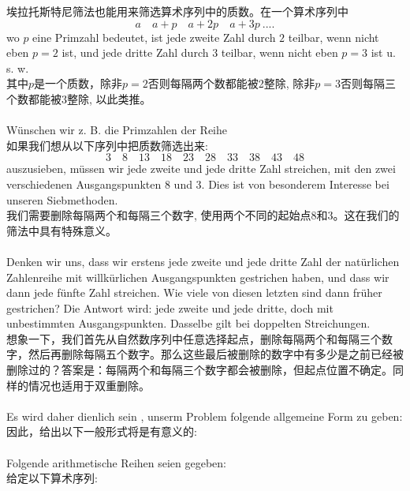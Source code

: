 \documentclass[UTF8,a4paper,zihao=-4]{article}
\begin{document}
\indent 埃拉托斯特尼筛法也能用来筛选算术序列中的质数。在一个算术序列中
$$
a\quad a + p\quad a + 2p\quad a + 3p\ ....
$$
wo $p$ eine Primzahl bedeutet, ist jede zweite Zahl durch $2$ teilbar, wenn nicht eben $p = 2$ ist, und jede dritte Zahl durch $3$ teilbar, wenn nicht eben $p = 3$ ist u. s. w.\\
其中$p$是一个质数，除非$p = 2$否则每隔两个数都能被2整除, 除非$p=3$否则每隔三个数都能被$3$整除, 以此类推。\\\\
\indent Wünschen wir z. B. die Primzahlen der Reihe\\
\indent 如果我们想从以下序列中把质数筛选出来:
$$3\quad 8\quad 13\quad 18\quad 23\quad 28\quad 33\quad 38\quad 43\quad 48$$
auszusieben, müssen wir jede zweite und jede dritte Zahl streichen, mit den zwei verschiedenen Ausgangspunkten 8 und 3. Dies ist von besonderem Interesse bei unseren Siebmethoden.\\
我们需要删除每隔两个和每隔三个数字, 使用两个不同的起始点8和3。这在我们的筛法中具有特殊意义。\\\\
\indent Denken wir uns, dass wir erstens jede zweite und jede dritte Zahl der natürlichen Zahlenreihe mit willkürlichen Ausgangspunkten gestrichen haben, und dass wir dann jede fünfte Zahl streichen. Wie viele von diesen letzten sind dann früher gestrichen? Die Antwort wird: jede zweite und jede dritte, doch mit unbestimmten Ausgangspunkten. Dasselbe gilt bei doppelten Streichungen.\\
\indent 想象一下，我们首先从自然数序列中任意选择起点，删除每隔两个和每隔三个数字，然后再删除每隔五个数字。那么这些最后被删除的数字中有多少是之前已经被删除过的？答案是：每隔两个和每隔三个数字都会被删除，但起点位置不确定。同样的情况也适用于双重删除。\\\\
\indent Es wird daher dienlich sein , unserm Problem folgende allgemeine Form zu geben:\\
\indent 因此，给出以下一般形式将是有意义的:\\\\
\indent Folgende arithmetische Reihen seien gegeben:\\
\indent 给定以下算术序列:
\end{document}
